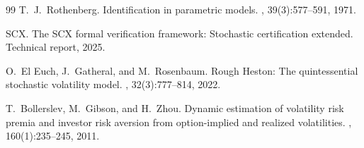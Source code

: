 \documentclass[11pt,a4paper]{article}
\theoremstyle{plain}
\theoremstyle{definition}
\theoremstyle{remark}
\newcommand{\SCX}{\textsc{SCX}}
\begin{document}
\begin{thebibliography}{99}
T.~J.~Rothenberg.
\newblock Identification in parametric models.
, 39(3):577--591, 1971.

\SCX.
\newblock The SCX formal verification framework: Stochastic certification
  extended.
\newblock Technical report, 2025.

O.~El Euch, J.~Gatheral, and M.~Rosenbaum.
\newblock Rough Heston: The quintessential stochastic volatility model.
, 32(3):777--814, 2022.

T.~Bollerslev, M.~Gibson, and H.~Zhou.
\newblock Dynamic estimation of volatility risk premia and investor risk
  aversion from option-implied and realized volatilities.
, 160(1):235--245, 2011.

\end{thebibliography}
\end{document}
